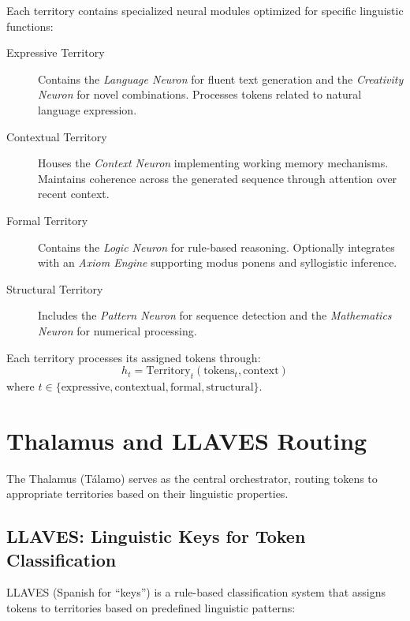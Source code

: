 \documentclass[11pt,a4paper]{article}
\begin{document}
Each territory contains specialized neural modules optimized for specific linguistic functions:

\begin{description}
    \item[Expressive Territory] Contains the \textit{Language Neuron} for fluent text generation and the \textit{Creativity Neuron} for novel combinations. Processes tokens related to natural language expression.
    
    \item[Contextual Territory] Houses the \textit{Context Neuron} implementing working memory mechanisms. Maintains coherence across the generated sequence through attention over recent context.
    
    \item[Formal Territory] Contains the \textit{Logic Neuron} for rule-based reasoning. Optionally integrates with an \textit{Axiom Engine} supporting modus ponens and syllogistic inference.
    
    \item[Structural Territory] Includes the \textit{Pattern Neuron} for sequence detection and the \textit{Mathematics Neuron} for numerical processing.
\end{description}

Each territory processes its assigned tokens through:
\begin{equation}
    h_t = \text{Territory}_t(\text{tokens}_t, \text{context})
\end{equation}
where $t \in \{\text{expressive}, \text{contextual}, \text{formal}, \text{structural}\}$.

\section{Thalamus and LLAVES Routing}
\label{sec:talamo}

The Thalamus (Tálamo) serves as the central orchestrator, routing tokens to appropriate territories based on their linguistic properties.

\subsection{LLAVES: Linguistic Keys for Token Classification}

LLAVES (Spanish for ``keys'') is a rule-based classification system that assigns tokens to territories based on predefined linguistic patterns:
\end{document}

